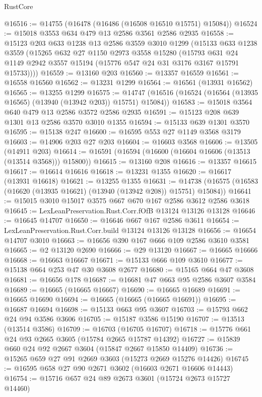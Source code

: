 \begin{lexlean}{RustCore}
\begin{coremodule}
@16516 := @14755 (@16478 (@16486 (@16508 @16510 @15751) @15084))
@16524 := @15018 @3553 @634 @479 @13 @2586 @3561 @2586 @2935
@16558 := @15123
    @203
    @633
    @1238
    @13
    @2586
    @3559
    @3010
    @1299
    (@15133
      @633
      @1238
      @3559
      (@15265
        @632
        @27
        @1150
        @2973
        @3558
        @15280
        (@15793 @631 @24 @1149 @2942 @3557 @15194 (@15776 @547 @24 @31 @3176 @3167 @15791 @15733))))
@16559 := @13160 @203
@16560 := @13357 @16559
@16561 := @16558 @16560
@16562 := @13231 @1299
@16564 := @16561 (@13931 @16562)
@16565 := @13255 @1299
@16575 := @14747 (@16516 (@16524 (@16564 (@13935 @16565) (@13940 (@13942 @203)) @15751) @15084))
@16583 := @15018 @3564 @640 @479 @13 @2586 @3572 @2586 @2935
@16591 := @15123 @208 @639 @1301 @13 @2586 @3570 @3010 @1355
@16594 := @15133 @639 @1301 @3570
@16595 := @15138 @247
@16600 := @16595 @553 @27 @1149 @3568 @3179
@16603 := @14906 @203 @27 @203
@16604 := @16603 @3568
@16606 := @13505 (@14911 @203)
@16614 := @16591 (@16594 (@16600 (@16604 @16606 (@13513 (@13514 @3568))) @15800))
@16615 := @13160 @208
@16616 := @13357 @16615
@16617 := @16614 @16616
@16618 := @13231 @1355
@16620 := @16617 (@13931 @16618)
@16621 := @13255 @1355
@16631 := @14738 (@16575 (@16583 (@16620 (@13935 @16621) (@13940 (@13942 @208)) @15751) @15084))
@16641 := @15015 @3010 @15017 @3575 @667 @670 @167 @2586 @3612 @2586 @3618
@16645 := LexLeanPreservation.Rust.Corr.fOfB @13124 @13126 @13128
@16646 := @16645 @14707
@16650 := @16646 @667 @167 @2586 @3611
@16654 := LexLeanPreservation.Rust.Corr.build @13124 @13126 @13128
@16656 := @16654 @14707 @3010
@16663 := @16656 @390 @167 @666 @109 @2586 @3610 @3581
@16665 := @2 @13120 @2690
@16666 := @29 @13120
@16667 := @16665 @16666
@16668 := @16663 @16667
@16671 := @15133 @666 @109 @3610
@16677 := @15138 @664 @253 @47 @30 @3608 @2677
@16680 := @15165 @664 @47 @3608
@16681 := @16656 @178
@16687 := @16681 @47 @663 @95 @2586 @3607 @3584
@16689 := @16665 (@16665 @16667)
@16690 := @16665 @16689
@16691 := @16665 @16690
@16694 := @16665 (@16665 (@16665 @16691))
@16695 := @16687 @16694
@16698 := @15133 @663 @95 @3607
@16703 := @15793 @662 @24 @94 @3586 @3606
@16705 := @15187 @3586 @15190
@16707 := @13513 (@13514 @3586)
@16709 := @16703 (@16705 @16707)
@16718 := @15776 @661 @24 @93 @2665 @3605 (@15784 @2665 @15787 @14392)
@16727 := @15839 @660 @24 @92 @2667 @3604 (@15847 @2667 @15850 @14409)
@16736 := @15265 @659 @27 @91 @2669 @3603 (@15273 @2669 @15276 @14426)
@16745 := @16595 @658 @27 @90 @2671 @3602 (@16603 @2671 @16606 @14443)
@16754 := @15716 @657 @24 @89 @2673 @3601 (@15724 @2673 @15727 @14460)

\end{coremodule}
\end{lexlean}
